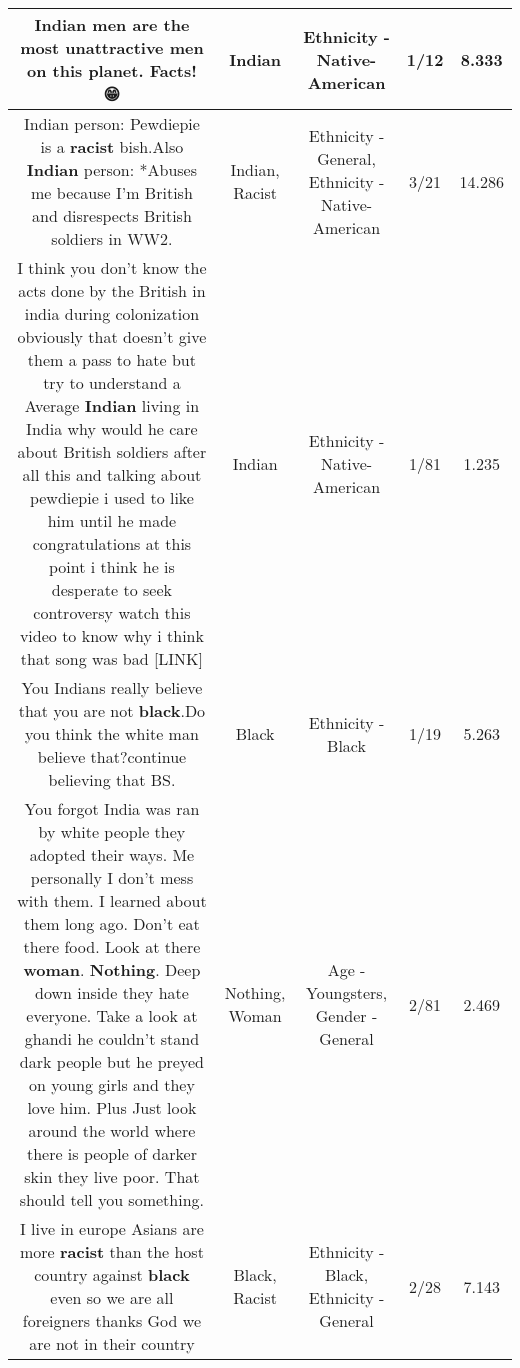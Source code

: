 \documentclass[11pt]{article}
\newlength\mylength
\begin{document}
\begin{center}
\begin{longtable}{|C{.65\mylength}|C{.30\mylength}|C{.12\mylength}|C{.12\mylength}|C{.12\mylength}|}
  \small Indian men are the most unattractive men on this planet. Facts! 😁\normalsize   & Indian & Ethnicity - Native-American & 1/12 & 8.333 \\  \hline
  \small Indian person: Pewdiepie is a \textbf{racist} bish.Also \textbf{Indian} person: *Abuses me because I'm British and disrespects British soldiers in WW2.\normalsize   & Indian, Racist & Ethnicity - General, Ethnicity - Native-American & 3/21 & 14.286 \\  \hline
  \small I think you don't know the acts done by the British in india during colonization obviously that doesn't give them a pass to hate but try to understand  a Average \textbf{Indian} living in  India why would he care about British soldiers after all this and talking about pewdiepie i used to like him until he made  congratulations at this point i think he is desperate to seek controversy watch this video to know why i think that song was bad  [LINK] \normalsize   & Indian & Ethnicity - Native-American & 1/81 & 1.235 \\  \hline
  \small You Indians really believe that you are not \textbf{black}.Do you think the white man believe that?continue believing that BS.\normalsize   & Black & Ethnicity - Black & 1/19 & 5.263 \\  \hline
  \small You forgot India was ran by white people they adopted their ways. Me personally I don't mess with them. I learned about them long ago. Don't eat there food. Look at there \textbf{woman}. \textbf{Nothing}. Deep down inside they hate everyone.  Take a look at ghandi he couldn't stand dark people but he preyed on young girls and they love him. Plus Just look around the world where there is people of darker skin they live poor. That should tell you something.\normalsize   & Nothing, Woman & Age - Youngsters, Gender - General & 2/81 & 2.469 \\  \hline
  \small I live in europe Asians are more \textbf{racist} than the host country against \textbf{black} even so we are all foreigners thanks God we are not in their country\normalsize   & Black, Racist & Ethnicity - Black, Ethnicity - General & 2/28 & 7.143 \\  \hline

\end{longtable}
\end{center}
\end{document}
